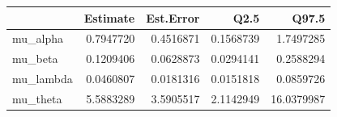 
\begin{tabular}{lrrrr}
\toprule
  & Estimate & Est.Error & Q2.5 & Q97.5\\
\midrule
mu\_alpha & 0.7947720 & 0.4516871 & 0.1568739 & 1.7497285\\
mu\_beta & 0.1209406 & 0.0628873 & 0.0294141 & 0.2588294\\
mu\_lambda & 0.0460807 & 0.0181316 & 0.0151818 & 0.0859726\\
mu\_theta & 5.5883289 & 3.5905517 & 2.1142949 & 16.0379987\\
\bottomrule
\end{tabular}
